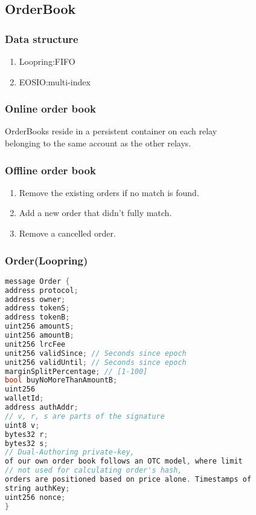 \documentclass[]{article}
\begin{document}
\subsection{OrderBook}

\subsubsection{Data structure}
\begin{enumerate}
\item Loopring:FIFO
\item EOSIO:multi-index
\end{enumerate}
\subsubsection{Online order book}
OrderBooks reside in a persistent container on each relay\\
belonging to the same account as the other relays.
\subsubsection{Offline order book}
\begin{enumerate}
	\item Remove the existing orders if no match is found.
	\item Add a new order that didn't fully match.
	\item Remove a cancelled order.
\end{enumerate}

\subsubsection{Order(Loopring)}
\begin{lstlisting}[language=C++, caption={C++ code using listings}]
message Order {
address protocol;
address owner;
address tokenS;
address tokenB;
uint256 amountS;
uint256 amountB;
unit256 lrcFee
unit256 validSince; // Seconds since epoch
unit256 validUntil; // Seconds since epoch
marginSplitPercentage; // [1-100]
bool buyNoMoreThanAmountB;
uint256
walletId;
address authAddr;
// v, r, s are parts of the signature
uint8 v;
bytes32 r;
bytes32 s;
// Dual-Authoring private-key,
of our own order book follows an OTC model, where limit
// not used for calculating order's hash,
orders are positioned based on price alone. Timestamps of
string authKey;
uint256 nonce;
}

\end{lstlisting}
\end{document}
